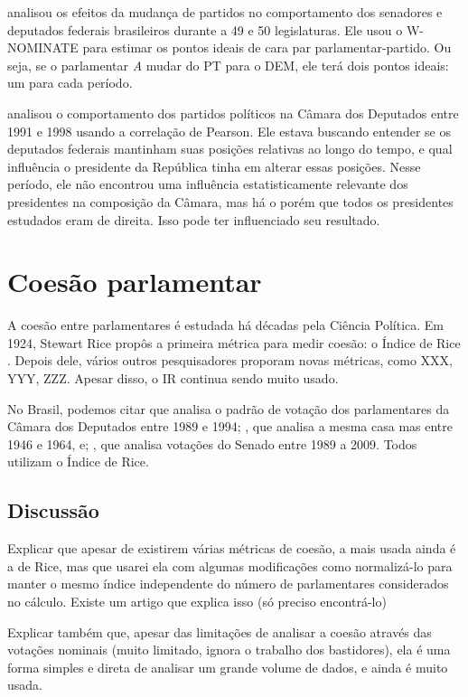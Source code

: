  analisou os efeitos da mudança de partidos no
comportamento dos senadores e deputados federais brasileiros durante a
49\textordfeminine{} e 50\textordfeminine{} legislaturas. Ele usou o W-NOMINATE
para estimar os pontos ideais de cara par parlamentar-partido. Ou seja, se o
parlamentar \emph{A} mudar do PT para o DEM, ele terá dois pontos ideais: um
para cada período.

 analisou o comportamento dos partidos políticos na
Câmara dos Deputados entre 1991 e 1998 usando a correlação de Pearson. Ele
estava buscando entender se os deputados federais mantinham suas posições
relativas ao longo do tempo, e qual influência o presidente da República tinha
em alterar essas posições. Nesse período, ele não encontrou uma influência
estatisticamente relevante dos presidentes na composição da Câmara, mas há o
porém que todos os presidentes estudados eram de direita. Isso pode ter
influenciado seu resultado.

\section{Coesão parlamentar}

A coesão entre parlamentares é estudada há décadas pela Ciência Política. Em 1924, Stewart Rice propôs a primeira métrica para medir coesão: o Índice de Rice \cite{Rice1924}. Depois dele, vários outros pesquisadores proporam novas métricas, como XXX, YYY, ZZZ. Apesar disso, o IR continua sendo muito usado.

No Brasil, podemos citar  que analisa o padrão de
votação dos parlamentares da Câmara dos Deputados entre 1989 e 1994;
, que analisa a mesma casa mas entre 1946 e 1964, e;
, que analisa votações do Senado entre 1989 a 2009. Todos utilizam o Índice de Rice.

\subsection{Discussão}

Explicar que apesar de existirem várias métricas de coesão, a mais usada ainda é a de Rice, mas que usarei ela com algumas modificações como normalizá-lo para manter o mesmo índice independente do número de parlamentares considerados no cálculo. Existe um artigo que explica isso (só preciso encontrá-lo)

Explicar também que, apesar das limitações de analisar a coesão através das votações nominais (muito limitado, ignora o trabalho dos bastidores), ela é uma forma simples e direta de analisar um grande volume de dados, e ainda é muito usada.

